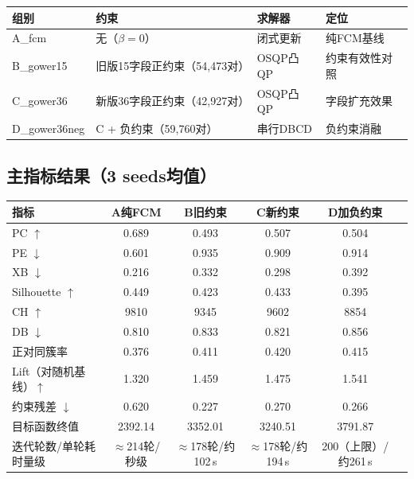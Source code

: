 \documentclass[11pt,a4paper]{ctexart}
\begin{document}
	\begin{table}[H]
		\centering
		\small
		\begin{tabular}{p{2.2cm}p{2.8cm}p{2.6cm}p{4.2cm}}
			\toprule
			组别 & 约束 & 求解器 & 定位 \\
			\midrule
			A\_fcm & 无（$\beta=0$） & 闭式更新 & 纯FCM基线 \\
			B\_gower15 & 旧版15字段正约束（54,473对） & OSQP凸QP & 约束有效性对照 \\
			C\_gower36 & 新版36字段正约束（42,927对） & OSQP凸QP & 字段扩充效果 \\
			D\_gower36neg & C + 负约束（59,760对） & 串行DBCD & 负约束消融 \\
			\bottomrule
		\end{tabular}
	\end{table}
	
	\subsection{主指标结果（3 seeds均值）}
	
	\begin{table}[H]
		\centering
		\small
		\setlength{\tabcolsep}{4pt}
		\begin{tabular}{lccccc}
			\toprule
			指标 & A纯FCM & B旧约束 & C新约束 & D加负约束 \\
			\midrule
			PC $\uparrow$ & 0.689 & 0.493 & 0.507 & 0.504 \\
			PE $\downarrow$ & 0.601 & 0.935 & 0.909 & 0.914 \\
			XB $\downarrow$ & 0.216 & 0.332 & 0.298 & 0.392 \\
			Silhouette $\uparrow$ & 0.449 & 0.423 & 0.433 & 0.395 \\
			CH $\uparrow$ & 9810 & 9345 & 9602 & 8854 \\
			DB $\downarrow$ & 0.810 & 0.833 & 0.821 & 0.856 \\
			正对同簇率 & 0.376 & 0.411 & 0.420 & 0.415 \\
			Lift（对随机基线）$\uparrow$ & 1.320 & 1.459 & 1.475 & 1.541 \\
			约束残差 $\downarrow$ & 0.620 & 0.227 & 0.270 & 0.266 \\
			目标函数终值 & 2392.14 & 3352.01 & 3240.51 & 3791.87 \\
			迭代轮数/单轮耗时量级 & $\approx$214轮/秒级 & $\approx$178轮/约102\,s & $\approx$178轮/约194\,s & 200（上限）/约261\,s \\
			\bottomrule
		\end{tabular}
	\end{table}
	
\end{document}
